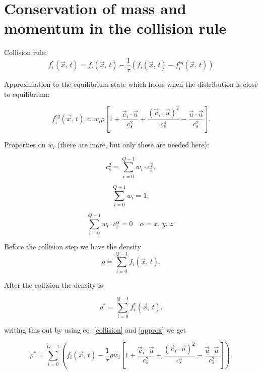

\section{Conservation of mass and momentum in the collision rule}


Collision rule:
\begin{equation}
    f_i^*(\vec{x}, \, t) = f_i(\vec{x}, \, t) - \frac{1}{\tau}(f_i(\vec{x},\, t) - f_i^{eq}(\vec{x}, \, t))
\label{collision}
\end{equation}


Approximation to the equilibrium state which holds when the distribution is close to equilibrium:

\begin{equation}
    f_i^{eq}(\vec{x}, \, t) \approx w_i\rho 
    \left[ 1 + 
    \frac{ \vec{c}_i \cdot \vec{u} }{c_s^2} + 
    \frac{(\vec{c}_i \cdot \vec{u})^2}{c_s^4} -
    \frac{\vec{u}\cdot\vec{u}}{c_s^2}
    \right].
\label{approx}
\end{equation}

Properties on $w_i$ (there are more, but only these are needed here):

\begin{equation}
    c_s^2 = \sum_{i=0}^{Q-1} w_i\cdot c_i ^2,
\end{equation}

\begin{equation}
    \sum_{i=0}^{Q-1} w_i = 1,
\end{equation}

\begin{equation}
    \sum_{i=0}^{Q-1} w_i \cdot c_i^\alpha = 0 \quad  \alpha = x,\, y, \, z.
\end{equation}

Before the collision step we have the density
\begin{equation}
\rho = \sum_{i=0}^{Q-1} f_i(\vec{x}, \, t) .
\end{equation}

After the collision the density is

\begin{equation}
    \rho^* = \sum_{i=0}^{Q-1} f_i^*(\vec{x}, \, t).
\end{equation}


writing this out by using eq. \ref{collision} and \ref{approx} we get

\begin{equation}
    \rho^* = \sum_{i=0}^{Q-1} \left(  f_i(\vec{x}, \, t) - 
             \frac{1}{\tau} \rho w_i \left[1 +
             \frac{ \vec{c}_i \cdot \vec{u} }{c_s^2} + 
             \frac{(\vec{c}_i \cdot \vec{u})^2}{c_s^4} -
             \frac{\vec{u}\cdot\vec{u}}{c_s^2}
             \right]
             \right).
\end{equation}

